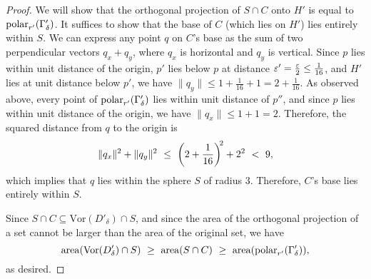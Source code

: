 \documentclass[11pt]{article}   \usepackage[letterpaper,hmargin=2.1cm,vmargin=3cm]{geometry}
\newcommand{\inv}[1]{\frac{1}{#1}}
\newcommand{\area}{\mathrm{area}}
\newcommand{\Vor}{\mathrm{Vor}}
\begin{document}
\begin{proof}
We will show that the orthogonal projection of $S \cap C$ onto $H'$ is equal to $\mathrm{polar}_{r'}(\Gamma'_{\delta})$. It suffices to show that the base of $C$ (which lies on $H'$) lies entirely within $S$. We can express any point $q$ on $C$'s base as the sum of two perpendicular vectors $q_x + q_y$, where $q_x$ is horizontal and $q_y$ is vertical. Since $p$ lies within unit distance of the origin, $p'$ lies below $p$ at distance $\eps' = \frac{\eps}{2} \le \inv{16}$, and $H'$ lies at unit distance below $p'$, we have $\|q_y\| \le 1 + \inv{16} + 1 = 2 + \inv{16}$. As observed above, every point of $\mathrm{polar}_{r'}(\Gamma'_{\delta})$ lies within unit distance of $p''$, and since $p$ lies within unit distance of the origin, we have $\|q_x\| \le 1 + 1 = 2$. Therefore, the squared distance from $q$ to the origin is
\[
	\|q_x\|^2 + \|q_y\|^2
		~ \le ~ \left( 2 + \inv{16} \right)^{\N 2} + 2^2
		~  <  ~ 9,
\]
which implies that $q$ lies within the sphere $S$ of radius $3$. Therefore, $C$'s base lies entirely within $S$.

Since $S \cap C \subseteq \Vor(D'_{\delta}) \cap S$, and since the area of the orthogonal projection of a set cannot be larger than the area of the original set, we have
\[
	\area(\Vor(D'_{\delta}) \cap S)
		~ \ge ~ \area(S \cap C)
		~ \ge ~ \area(\polarX{r'}{\Gamma'_{\delta}}),
\]
as desired.
\end{proof}
\end{document}
